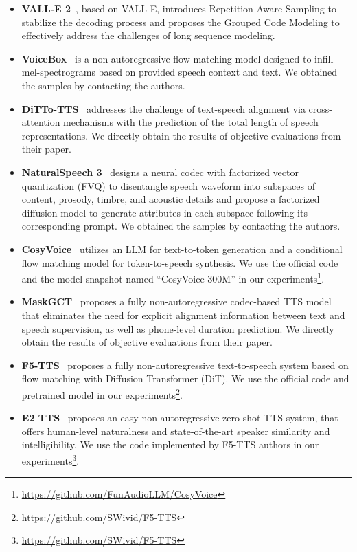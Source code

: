 \begin{itemize}

\item \textbf{VALL-E 2}~\citep{chen2024vall}, based on VALL-E, introduces Repetition Aware Sampling to stabilize the decoding process and proposes the Grouped Code Modeling to effectively address the challenges of long sequence modeling.

\item \textbf{VoiceBox}~\citep{le2023Voicebox} is a non-autoregressive flow-matching model designed to infill mel-spectrograms based on provided speech context and text. We obtained the samples by contacting the authors.


\item \textbf{DiTTo-TTS}~\citep{lee2024ditto} addresses
the challenge of text-speech alignment via cross-attention mechanisms with the prediction of the total length of speech representations. We directly obtain the results of objective evaluations from their paper.

\item \textbf{NaturalSpeech 3}~\citep{ju2024naturalspeech} designs a neural codec with factorized vector quantization (FVQ) to disentangle speech waveform into subspaces of content, prosody, timbre, and acoustic details and propose a factorized diffusion model to generate attributes in each subspace following its corresponding prompt. We obtained the samples by contacting the authors.

\item \textbf{CosyVoice}~\citep{du2024cosyvoice} utilizes an LLM for text-to-token generation and a conditional flow matching model for token-to-speech synthesis. We use the official code and the model snapshot named ``CosyVoice-300M'' in our experiments\footnote{\url{https://github.com/FunAudioLLM/CosyVoice}}.


\item \textbf{MaskGCT}~\citep{wang2024maskgct} proposes a fully non-autoregressive codec-based TTS model that eliminates the need for explicit alignment information between text
and speech supervision, as well as phone-level duration prediction. We directly obtain the results of objective evaluations from their paper.

\item \textbf{F5-TTS}~\citep{chen2024f5} proposes a fully non-autoregressive text-to-speech system
based on flow matching with Diffusion Transformer (DiT). We use the official code and pretrained model in our experiments\footnote{\url{https://github.com/SWivid/F5-TTS}}.

\item \textbf{E2 TTS}~\citep{eskimez2024e2} proposes an easy non-autoregressive zero-shot TTS system, that offers human-level naturalness and state-of-the-art speaker similarity and intelligibility. We use the code implemented by F5-TTS authors in our experiments\footnote{\url{https://github.com/SWivid/F5-TTS}}.
\end{itemize}

